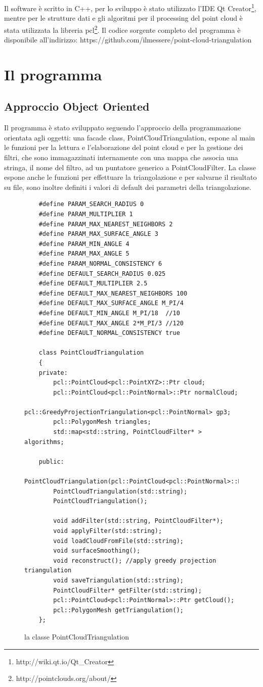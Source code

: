 \documentclass[a4paper,12pt]{article}
\begin{document}
	Il software è scritto in C++, per lo sviluppo è stato utilizzato l'IDE Qt Creator\footnote{http://wiki.qt.io/Qt\_Creator},
	mentre per le strutture dati e gli algoritmi per il processing del point cloud è stata utilizzata la libreria
	pcl\footnote{http://pointclouds.org/about/}.	
	Il codice sorgente completo del programma è disponibile all'indirizzo: 
	https://github.com/ilmessere/point-cloud-triangulation	
	
\clearpage
\section{Il programma}
	\subsection{Approccio Object Oriented}
	Il programma è stato sviluppato seguendo l'approccio della programmazione orientata agli oggetti: 
	una facade class, PointCloudTriangulation, espone al main le funzioni per la lettura  e l'elaborazione del point cloud
	e per la gestione dei filtri, che sono immagazzinati internamente con una mappa che associa una stringa, 
	il nome del filtro, ad un puntatore generico a PointCloudFilter.	
	La classe espone anche le funzioni per effettuare la triangolazione e per salvarne il risultato su file, sono
	inoltre definiti i valori di default dei parametri della triangolazione.
	\begin{figure}[H]	
	\begin{lstlisting}	
	#define PARAM_SEARCH_RADIUS 0
	#define PARAM_MULTIPLIER 1
	#define PARAM_MAX_NEAREST_NEIGHBORS 2
	#define PARAM_MAX_SURFACE_ANGLE 3
	#define PARAM_MIN_ANGLE 4
	#define PARAM_MAX_ANGLE 5
	#define PARAM_NORMAL_CONSISTENCY 6	
	#define DEFAULT_SEARCH_RADIUS 0.025
	#define DEFAULT_MULTIPLIER 2.5
	#define DEFAULT_MAX_NEAREST_NEIGHBORS 100
	#define DEFAULT_MAX_SURFACE_ANGLE M_PI/4 
	#define DEFAULT_MIN_ANGLE M_PI/18  //10
	#define DEFAULT_MAX_ANGLE 2*M_PI/3 //120
	#define DEFAULT_NORMAL_CONSISTENCY true
	
	class PointCloudTriangulation
	{
	private:
    	pcl::PointCloud<pcl::PointXYZ>::Ptr cloud;
    	pcl::PointCloud<pcl::PointNormal>::Ptr normalCloud;
    	pcl::GreedyProjectionTriangulation<pcl::PointNormal> gp3;
    	pcl::PolygonMesh triangles;
    	std::map<std::string, PointCloudFilter* > algorithms;
    
	public:
   		PointCloudTriangulation(pcl::PointCloud<pcl::PointNormal>::Ptr);
    	PointCloudTriangulation(std::string);
    	PointCloudTriangulation();

	    void addFilter(std::string, PointCloudFilter*);
    	void applyFilter(std::string);
    	void loadCloudFromFile(std::string);
    	void surfaceSmoothing();
    	void reconstruct(); //apply greedy projection triangulation
    	void saveTriangulation(std::string);
    	PointCloudFilter* getFilter(std::string);
    	pcl::PointCloud<pcl::PointNormal>::Ptr getCloud();
    	pcl::PolygonMesh getTriangulation();    
	};	
	\end{lstlisting}
	\label{fig:PointCloudTriangulation}
	\caption{la classe PointCloudTriangulation}
	\end{figure}
	\clearpage
	
\end{document}
